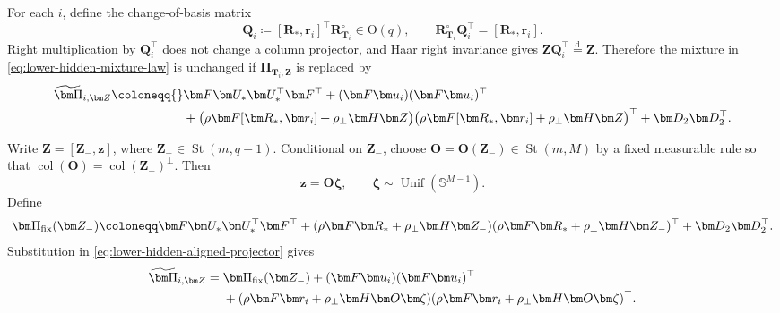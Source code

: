 \documentclass[11pt]{article}
\newcommand{\trans}{\top}
\DeclareMathOperator{\St}{St}
\newcommand{\Ogp}{\mathrm{O}}
\begin{document}
For each $i$, define the change-of-basis matrix
\begin{equation}
  \bm Q_i
  \coloneqq
  [\bm R_*,\bm r_i]^\trans\bm R_{\bm T_i}^{\circ}
  \in\Ogp(q),
  \qquad
  \bm R_{\bm T_i}^{\circ}\bm Q_i^\trans
  =
  [\bm R_*,\bm r_i].
\label{eq:lower-hidden-change-of-basis}
\end{equation}
Right multiplication by $\bm Q_i^\trans$ does not change a column
projector, and Haar right invariance gives
$\bm Z\bm Q_i^\trans\overset{\mathrm d}{=}\bm Z$.  Therefore the mixture
in \cref{eq:lower-hidden-mixture-law} is unchanged if
$\bm\Pi_{\bm T_i,\bm Z}$ is replaced by
\begin{align}
  \widetilde{\bm\Pi}_{i,\bm Z}
  \coloneqq{}&
  \bm F\bm U_*\bm U_*^\trans\bm F^\trans
  +
  (\bm F\bm u_i)(\bm F\bm u_i)^\trans
  \notag\\
  &+
  \bigl(
    \rho\bm F[\bm R_*,\bm r_i]
    +
    \rho_\perp\bm H\bm Z
  \bigr)
  \bigl(
    \rho\bm F[\bm R_*,\bm r_i]
    +
    \rho_\perp\bm H\bm Z
  \bigr)^\trans
  +
  \bm D_2\bm D_2^\trans.
\label{eq:lower-hidden-aligned-projector}
\end{align}

Write $\bm Z=[\bm Z_-,\bm z]$, where
$\bm Z_-\in\St(m,q-1)$.  Conditional on $\bm Z_-$, choose
$\bm O=\bm O(\bm Z_-)\in\St(m,M)$ by a fixed measurable rule so that
$\operatorname{col}(\bm O)=\operatorname{col}(\bm Z_-)^\perp$.  Then
\begin{equation}
  \bm z=\bm O\bm\zeta,
  \qquad
  \bm\zeta\sim\operatorname{Unif}(\mathbb S^{M-1}).
\label{eq:lower-hidden-zeta}
\end{equation}
Define
\begin{equation}
  \bm\Pi_{\rm fix}(\bm Z_-)
  \coloneqq
  \bm F\bm U_*\bm U_*^\trans\bm F^\trans
  +
  (\rho\bm F\bm R_*+\rho_\perp\bm H\bm Z_-)
  (\rho\bm F\bm R_*+\rho_\perp\bm H\bm Z_-)^\trans
  +
  \bm D_2\bm D_2^\trans.
\label{eq:lower-hidden-Pi-fix}
\end{equation}
Substitution in \cref{eq:lower-hidden-aligned-projector} gives
\begin{align}
  \widetilde{\bm\Pi}_{i,\bm Z}
  ={}&
  \bm\Pi_{\rm fix}(\bm Z_-)
  +
  (\bm F\bm u_i)(\bm F\bm u_i)^\trans
  \notag\\
  &+
  (\rho\bm F\bm r_i+\rho_\perp\bm H\bm O\bm\zeta)
  (\rho\bm F\bm r_i+\rho_\perp\bm H\bm O\bm\zeta)^\trans.
\label{eq:lower-hidden-projector-decomposition}
\end{align}
\end{document}
